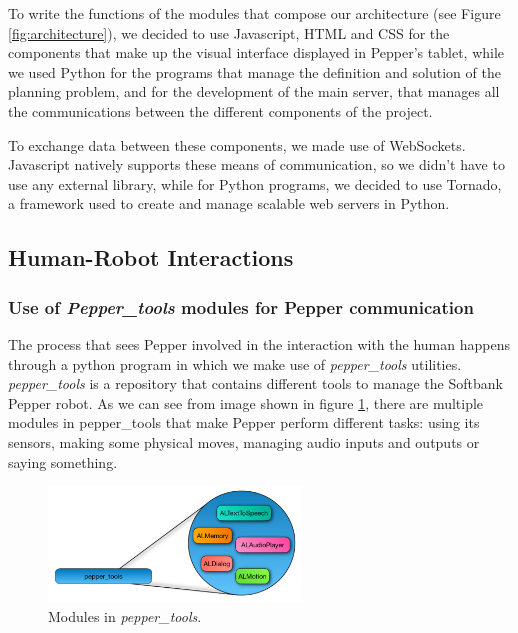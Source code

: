 \documentclass{article}
\begin{document}
To write the functions of the modules that compose our architecture (see Figure \ref{fig:architecture}), we decided to use Javascript, HTML and CSS for the components that make up the visual interface displayed in Pepper's tablet, while we used Python for the programs that manage the definition and solution of the planning problem, and for the development of the main server, that manages all the communications between the different components of the project.

To exchange data between these components, we made use of WebSockets. Javascript natively supports these means of communication, so we didn't have to use any external library, while for Python programs, we decided to use Tornado, a framework used to create and manage scalable web servers in Python.

\subsection{Human-Robot Interactions}
\subsubsection{Use of \textit{Pepper\_tools} modules for Pepper communication}

The process that sees Pepper involved in the interaction with the human happens through a python program in which we make use of \textit{pepper\_tools} utilities. \textit{pepper\_tools} is a repository that contains different tools to manage the Softbank Pepper robot. As we can see from image shown in figure \ref{fig:detail_of_pepper_tools}, there are multiple modules in pepper\_tools that make Pepper perform different tasks: using its sensors, making some physical moves, managing audio inputs and outputs  or saying something.

\begin{figure}[H]
    \centering
    \includegraphics[width=0.6\textwidth]{images/detail_of_pepper_tools.png}
    \caption{Modules in \textit{pepper\_tools}.}
    \label{fig:detail_of_pepper_tools}
\end{figure}
\end{document}
